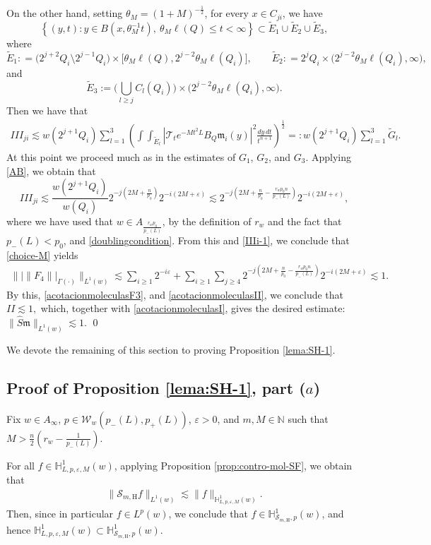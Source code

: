 \documentclass[11pt, a4paper,leqno]{amsart}
\newcommand{\mm}{\mathfrak{m}}
\theoremstyle{plain}
\theoremstyle{definition}
\theoremstyle{remark}
\numberwithin{equation}{section}
\def \N{ \mathbb{N} }
\def \Scal{ \mathcal{S} }
\def \hh{ \mathrm{H} }
\def \iint{\int\!\!\!\int}
\begin{document}
On the other hand, setting $\theta_M=(1+M)^{-\frac12}$, for every $x\in C_{ji}$, we have
$$
\left\{(y,t):y\in B(x,\theta_M^{-1}t),\ \theta_M\ell(Q)\leq t<\infty\right\}
\subset \widetilde{E}_1\cup \widetilde{E}_2\cup \widetilde{E}_3,
$$
where
$$
\widetilde{E}_1:
=
\big(2^{j+2}Q_i\setminus 2^{j-1}Q_i\big)
\times
\big[\theta_M \ell(Q),2^{j-2}\theta_M\ell(Q_i)\big],
\qquad
\widetilde{E}_2:
=
2^{j}Q_i\times \big(2^{j-2}\theta_M\ell(Q_i),\infty\big),
$$
and
$$
\widetilde{E}_3:=
\Big(\bigcup_{l\geq j}C_l(Q_i)\Big)\times \big(
2^{j-2}\theta_M \ell(Q_i),\infty\big).
$$
Then we have that
\begin{align*}
III_{ji}
\lesssim w(2^{j+1}Q_i)
\sum_{l=1}^{3}
\left(\iint_{\widetilde{E}_l}|\mathcal{T}_{t}e^{-Mt^2L}B_Q\mm_i(y)|^2\frac{dy\,dt}{t^{n+1}}\right)^{\frac{1}{2}}=:w(2^{j+1}Q_i)
\sum_{l=1}^{3}\widetilde{G}_l.
\end{align*}
At this point we proceed much as in the estimates of $G_1$, $G_2$, and $G_3$. Applying \eqref{AB}, we obtain that
$$
III_{ji}\lesssim \frac{w(2^{j+1}Q_i)}{w(Q_i)}2^{-j\left(2M+\frac{n}{p_0}\right)}
2^{-i(2M+\varepsilon)}
\lesssim
2^{-j\left(2M+\frac{n}{p_0}-\frac{r_wp_0n}{p_-(L)}\right)}
2^{-i(2M+\varepsilon)},
$$
where we have used that $w\in A_{\frac{r_wp_0}{p_-(L)}}$, by the definition of $r_w$ and the fact that $p_-(L)<p_0$, and \eqref{doublingcondition}.
From this and \eqref{IIIi-1}, we conclude that \eqref{choice-M} yields
\begin{align*}
 \big\||\|F_4\||_{\Gamma(\cdot)}\big\|_{L^1(w)}\lesssim \sum_{i\geq 1}2^{-i\varepsilon}+\sum_{i\geq 1}\sum_{j\geq 4}2^{-j\left(2M+\frac{n}{p_0}-\frac{r_wp_0n}{p_-(L)}\right)}
2^{-i(2M+\varepsilon)}\lesssim 1.
 \end{align*}
By this, \eqref{acotacionmoleculasF3}, and  \eqref{acotacionmoleculasII}, we conclude that
$
II\lesssim 1,
$
which, together with \eqref{acotacionmoleculasI}, gives the desired estimate:
$
\|\widehat{S}\mm\|_{L^1(w)}\lesssim 1.
$
\qed

We devote the remaining of this section to proving Proposition \ref{lema:SH-1}.


\subsection{Proof of Proposition \ref{lema:SH-1}, part ($a$)}
Fix $w\in A_{\infty}$, $p\in \mathcal{W}_w(p_-(L),p_+(L))$, $\varepsilon>0$, and $m, M\in \N$ such that $M>\frac{n}{2}\left(r_w-\frac{1}{p_-(L)}\right)$.

 For all $f\in \mathbb{H}_{L,p,\varepsilon,M}^1(w)$, applying Proposition \ref{prop:contro-mol-SF}, we obtain that
\begin{align}\label{SH-HL}
\|\Scal_{m,\hh}f\|_{L^1(w)}\lesssim \|f\|_{\mathbb{H}_{L,p,\varepsilon,M}^1(w)}.
\end{align}
Then, since in particular $f\in L^p(w)$, we conclude that $f\in \mathbb{H}^1_{\Scal_{m,\hh},p}(w)$, and hence 
$
\mathbb{H}^1_{L,p,\varepsilon,M}(w)\subset \mathbb{H}^1_{\Scal_{m,\hh},p}(w).
$
\end{document}
